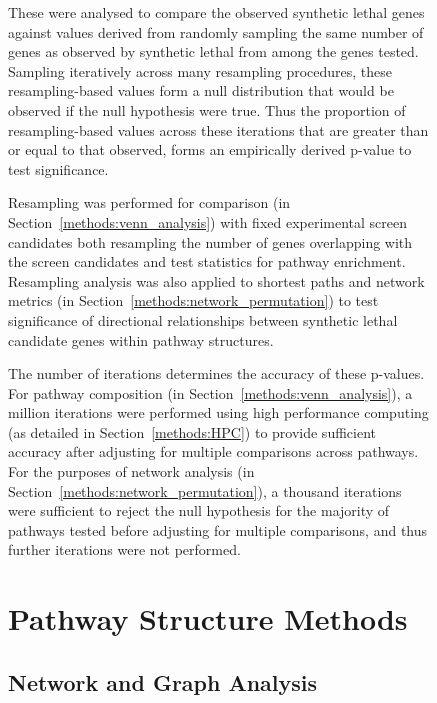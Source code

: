 \begin{figure}[!htp]
These were analysed to compare the observed synthetic lethal genes against values derived from randomly sampling the same number of genes as observed by synthetic lethal from among the genes tested. Sampling iteratively across many resampling procedures, these resampling-based values form a null distribution that would be observed if the null hypothesis were true. Thus the proportion of resampling-based values across these iterations that are greater than or equal to that observed, forms an empirically derived p-value to test significance.

Resampling was performed for comparison (in Section~\ref{methods:venn_analysis}) with fixed experimental screen candidates \citep{Telford2015} both resampling the number of genes overlapping with the screen candidates and test statistics for pathway enrichment. Resampling analysis was also applied to shortest paths and network metrics (in Section~\ref{methods:network_permutation}) to test significance of directional relationships between synthetic lethal candidate genes within pathway structures.

The number of iterations determines the accuracy of these p-values. For pathway composition (in Section~\ref{methods:venn_analysis}), a million iterations were performed using high performance computing (as detailed in Section~\ref{methods:HPC}) to provide sufficient accuracy after adjusting for multiple comparisons across pathways. For the purposes of network analysis (in Section~\ref{methods:network_permutation}), a thousand iterations were sufficient to reject the null hypothesis for the majority of pathways tested before adjusting for multiple comparisons, and thus further iterations were not performed.

\section{Pathway Structure Methods}

\subsection{Network and Graph Analysis}


\end{figure}
